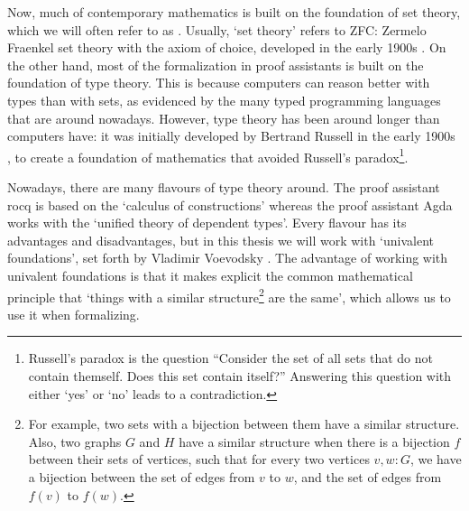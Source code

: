 Now, much of contemporary mathematics is built on the foundation of set theory, which we will often refer to as . Usually, `set theory' refers to ZFC: Zermelo Fraenkel set theory with the axiom of choice, developed in the early 1900s \autocite{Zermelo-set-theory}. On the other hand, most of the formalization in proof assistants is built on the foundation of type theory. This is because computers can reason better with types than with sets, as evidenced by the many typed programming languages that are around nowadays. However, type theory has been around longer than computers have: it was initially developed by Bertrand Russell in the early 1900s \autocite[][Appendix B]{Russell-type-theory}, to create a foundation of mathematics that avoided Russell's paradox\footnote{Russell's paradox is the question ``Consider the set of all sets that do not contain themself. Does this set contain itself?'' Answering this question with either `yes' or `no' leads to a contradiction.}.

Nowadays, there are many flavours of type theory around. The proof assistant rocq is based on the `calculus of constructions' whereas the proof assistant Agda works with the `unified theory of dependent types'. Every flavour has its advantages and disadvantages, but in this thesis we will work with `univalent foundations', set forth by Vladimir Voevodsky \autocite{voevodsky-univalent-foundations}. The advantage of working with univalent foundations is that it makes explicit the common mathematical principle that `things with a similar structure\footnote{For example, two sets with a bijection between them have a similar structure. Also, two graphs $ G $ and $ H $ have a similar structure when there is a bijection $ f $ between their sets of vertices, such that for every two vertices $ v, w : G $, we have a bijection between the set of edges from $ v $ to $ w $, and the set of edges from $ f(v) $ to $ f(w) $.} are the same', which allows us to use it when formalizing.

